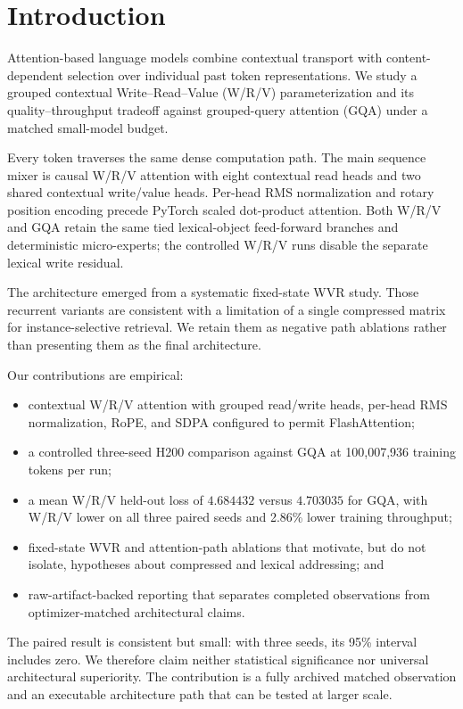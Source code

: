 \section{Introduction}

Attention-based language models combine contextual transport with content-dependent selection over individual past token representations. We study a grouped contextual Write--Read--Value (W/R/V) parameterization and its quality--throughput tradeoff against grouped-query attention (GQA) under a matched small-model budget.

Every token traverses the same dense computation path. The main sequence mixer is causal W/R/V attention with eight contextual read heads and two shared contextual write/value heads. Per-head RMS normalization and rotary position encoding precede PyTorch scaled dot-product attention. Both W/R/V and GQA retain the same tied lexical-object feed-forward branches and deterministic micro-experts; the controlled W/R/V runs disable the separate lexical write residual.

The architecture emerged from a systematic fixed-state WVR study. Those recurrent variants are consistent with a limitation of a single compressed matrix for instance-selective retrieval. We retain them as negative path ablations rather than presenting them as the final architecture.

Our contributions are empirical:
\begin{itemize}
    \item contextual W/R/V attention with grouped read/write heads, per-head RMS normalization, RoPE, and SDPA configured to permit FlashAttention;
    \item a controlled three-seed H200 comparison against GQA at 100,007,936 training tokens per run;
    \item a mean W/R/V held-out loss of $4.684432$ versus $4.703035$ for GQA, with W/R/V lower on all three paired seeds and 2.86\% lower training throughput;
    \item fixed-state WVR and attention-path ablations that motivate, but do not isolate, hypotheses about compressed and lexical addressing; and
    \item raw-artifact-backed reporting that separates completed observations from optimizer-matched architectural claims.
\end{itemize}

The paired result is consistent but small: with three seeds, its 95\% interval includes zero. We therefore claim neither statistical significance nor universal architectural superiority. The contribution is a fully archived matched observation and an executable architecture path that can be tested at larger scale.
